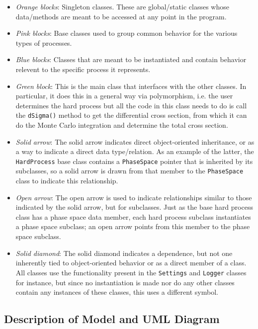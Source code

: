 \documentclass[titlepage]{article}
\begin{document}
\begin{itemize}
\item \textit{Orange blocks}: Singleton classes. These are global/static classes whose data/methods are meant to be accessed at any point in the program.
\item \textit{Pink blocks}: Base classes used to group common behavior for the various types of processes.
\item \textit{Blue blocks}: Classes that are meant to be instantiated and contain behavior relevent to the specific process it represents.
\item \textit{Green block}: This is the main class that interfaces with the other classes. In particular, it does this in a general way via polymorphism, i.e. the user determines the hard process but all the code in this class needs to do is call the \texttt{dSigma()} method to get the differential cross section, from which it can do the Monte Carlo integration and determine the total cross section.
\item \textit{Solid arrow}: The solid arrow indicates direct object-oriented inheritance, or as a way to indicate a direct data type/relation. As an example of the latter, the \texttt{HardProcess} base class contains a \texttt{PhaseSpace} pointer that is inherited by its subclasses, so a solid arrow is drawn from that member to the \texttt{PhaseSpace} class to indicate this relationship.
\item \textit{Open arrow}: The open arrow is used to indicate relationships similar to those indicated by the solid arrow, but for subclasses. Just as the base hard process class has a phase space data member, each hard process subclass instantiates a phase space subclass; an open arrow points from this member to the phase space subclass.
\item \textit{Solid diamond}: The solid diamond indicates a dependence, but not one inherently tied to object-oriented behavior or as a direct member of a class. All classes use the functionality present in the \texttt{Settings} and \texttt{Logger} classes for instance, but since no instantiation is made nor do any other classes contain any instances of these classes, this uses a different symbol.
\end{itemize}


\subsection*{Description of Model and UML Diagram}
\end{document}
